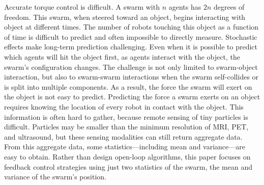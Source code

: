 Accurate torque control is difficult.
A swarm with $n$ agents has $2n$ degrees of freedom.  
This swarm, when steered toward an object, begins interacting with object at different times. 
The number of robots touching this object as a function of time is difficult to predict and often impossible to directly measure.
Stochastic effects make long-term prediction challenging.
Even when it is possible to predict which agents will hit the object first, as agents interact with the object, the swarm's configuration changes.
The challenge is not only limited to swarm-object interaction, but also to swarm-swarm interactions when the swarm self-collides  or is split into multiple components. 
As a result, the force the swarm will exert on the object is not easy to predict.
Predicting the force a swarm exerts on an object requires knowing the location of every robot in contact with the object. 
This information is often hard to gather, because remote sensing of tiny particles is difficult.
Particles may be smaller than the minimum resolution of MRI, PET, and ultrasound, but these sensing modalities can still return aggregate data.
From this aggregate data,  some statistics---including mean and variance---are easy to obtain. 
Rather than design open-loop algorithms, this paper focuses on feedback control strategies using just two statistics of the swarm, the mean and variance of the swarm's position.











